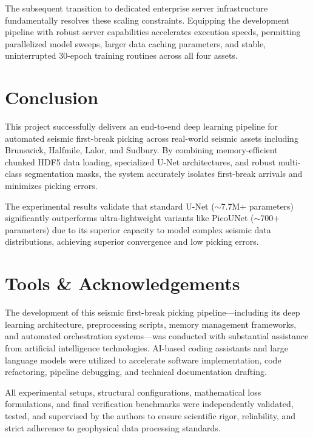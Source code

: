 \documentclass[conference]{IEEEtran}
\begin{document}
The subsequent transition to dedicated enterprise server infrastructure fundamentally resolves these scaling constraints. Equipping the development pipeline with robust server capabilities accelerates execution speeds, permitting parallelized model sweeps, larger data caching parameters, and stable, uninterrupted 30-epoch training routines across all four assets.

\section{Conclusion}
This project successfully delivers an end-to-end deep learning pipeline for automated seismic first-break picking across real-world seismic assets including Brunswick, Halfmile, Lalor, and Sudbury. By combining memory-efficient chunked HDF5 data loading, specialized U-Net architectures, and robust multi-class segmentation masks, the system accurately isolates first-break arrivals and minimizes picking errors.

The experimental results validate that standard U-Net ($\sim$7.7M+ parameters) significantly outperforms ultra-lightweight variants like PicoUNet ($\sim$700+ parameters) due to its superior capacity to model complex seismic data distributions, achieving superior convergence and low picking errors.

\section*{Tools \& Acknowledgements}
The development of this seismic first-break picking pipeline---including its deep learning architecture, preprocessing scripts, memory management frameworks, and automated orchestration systems---was conducted with substantial assistance from artificial intelligence technologies. AI-based coding assistants and large language models were utilized to accelerate software implementation, code refactoring, pipeline debugging, and technical documentation drafting.

All experimental setups, structural configurations, mathematical loss formulations, and final verification benchmarks were independently validated, tested, and supervised by the authors to ensure scientific rigor, reliability, and strict adherence to geophysical data processing standards.
\end{document}
